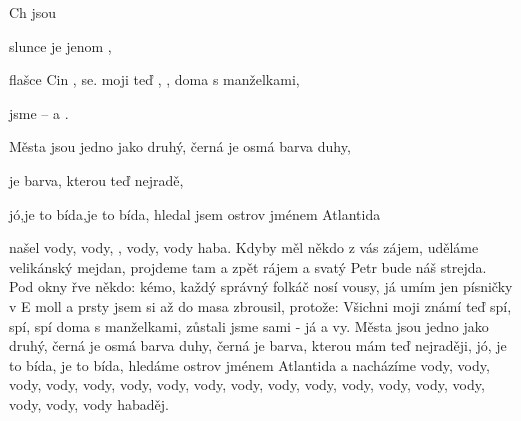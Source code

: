 
\zs
Ch jsou  

 slunce je  jenom ,

 flašce  Cin ,   se.
\ks
\zr
{} moji  teď , ,  doma s manželkami,

 jsme  –  a .

Města jsou jedno jako druhý, černá je osmá barva duhy,

 je barva, kterou  teď nejradě,

jó,je to bída,je to bída, hledal jsem ostrov jménem Atlantida

 našel vody, vody, , vody, vody haba.
\kr
\zs
Kdyby měl někdo z vás zájem,
uděláme velikánský mejdan,
projdeme tam a zpět rájem
a svatý Petr bude náš strejda.
\ks
\zr      \kr
\zs
Pod okny řve někdo: kémo,
každý správný folkáč nosí vousy,
já umím jen písničky v E moll
a prsty jsem si až do masa zbrousil, protože:
\ks
\zr
Všichni moji známí teď spí, spí, spí doma s manželkami,
zůstali jsme sami - já a vy.
Města jsou jedno jako druhý, černá je osmá barva duhy,
černá je barva, kterou mám teď nejraději,
jó, je to bída, je to bída, hledáme ostrov jménem Atlantida
a nacházíme vody, vody, vody, vody, vody, vody,
vody, vody, vody, vody, vody, vody,
vody, vody, vody, vody, vody, vody habaděj.
\kr
\kp







